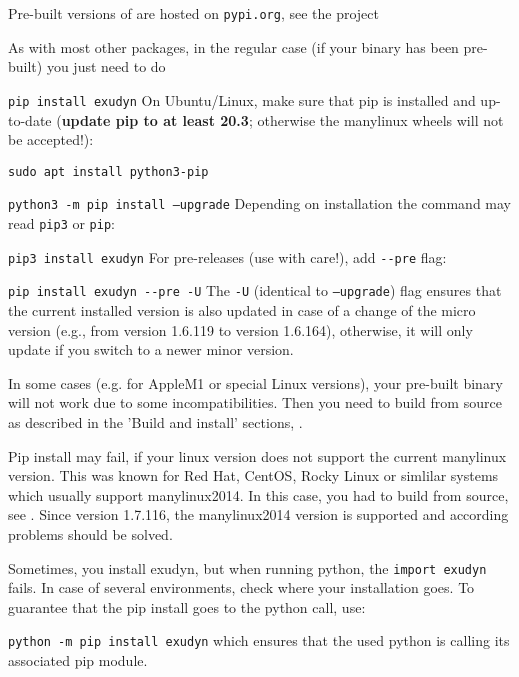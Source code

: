 Pre-built versions of \codeName are hosted on \texttt{pypi.org}, see the project
\bi
 \item {}
\ei
As with most other packages, in the regular case (if your binary has been pre-built) you just need to do
\bi
  \item[] \texttt{pip install exudyn}
\ei
On Ubuntu/Linux, make sure that pip is installed and up-to-date ({\bf update pip to at least 20.3}; otherwise the manylinux wheels will not be accepted!):
\bi 
  \item[] \texttt{sudo apt install python3-pip}
  \item[] \texttt{python3 -m pip install --upgrade}
\ei
Depending on installation the command may read \texttt{pip3} or \texttt{pip}: 
\bi
  \item[] \texttt{pip3 install exudyn}
\ei
For pre-releases (use with care!), add \texttt{-{}-pre} flag:
\bi
  \item[] \texttt{pip install exudyn -{}-pre -U}
\ei
The \texttt{-U} (identical to \texttt{--upgrade}) flag ensures that the current installed version is also updated in case of a change of the micro version (e.g., from version 1.6.119 to version 1.6.164), otherwise, it will only update if you switch to a newer minor version.

In some cases (e.g. for AppleM1 or special Linux versions), your pre-built binary will not work due to some incompatibilities. Then you need to build from source as described in the 'Build and install' sections, .

Pip install may fail, if your linux version does not support the current manylinux version.
This was known for Red Hat, CentOS, Rocky Linux or simlilar systems which usually support manylinux2014. In this case, you had to build \codeName from source, see . Since version 1.7.116, the manylinux2014 version is supported and according problems should be solved.

Sometimes, you install exudyn, but when running python, the \texttt{import exudyn} fails.
In case of several environments, check where your installation goes. To guarantee that the pip install goes to the python call, use:
\bi 
  \item[] \texttt{python -m pip install exudyn} 
\ei
which ensures that the used python is calling its associated pip module.

